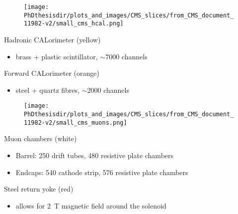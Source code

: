 \begin{frame}
\addtocounter{framenumber}{-1}
\transdissolve
\begin{minipage}[t]{.6\textwidth}
\begin{figure}
\texttt{[image: \\PhDthesisdir/plots\_and\_images/CMS\_slices/from\_CMS\_document\_11982-v2/small\_cms\_hcal.png]}
\end{figure}
\end{minipage}
\hfill\begin{minipage}[t]{.35\textwidth}
\begin{block}{Hadronic CALorimeter (yellow)}
\begin{itemize}
\item brass + plastic scintillator, $\sim\num{7000}$ channels
\end{itemize}
\end{block}

\begin{block}{Forward CALorimeter (orange)}
\begin{itemize}
\item steel + quartz fibres, $\sim\num{2000}$ channels
\end{itemize}
\end{block}
\end{minipage}
\end{frame}

\begin{frame}
\addtocounter{framenumber}{-1}
\transdissolve
\begin{minipage}[t]{.6\textwidth}
\begin{figure}
\texttt{[image: \\PhDthesisdir/plots\_and\_images/CMS\_slices/from\_CMS\_document\_11982-v2/small\_cms\_muons.png]}
\end{figure}
\end{minipage}
\hfill\begin{minipage}[t]{.35\textwidth}
\begin{block}{Muon chambers (white)}
\begin{itemize}
\item Barrel: \num{250} drift tubes, \num{480} resistive plate chambers
\item Endcaps: \num{540} cathode strip, \num{576} resistive plate chambers
\end{itemize}
\end{block}

\begin{block}{Steel return yoke (red)}
\begin{itemize}
\item allows for \SI{2}{\tesla} magnetic field around the solenoid
\end{itemize}
\end{block}
\end{minipage}
\end{frame}

